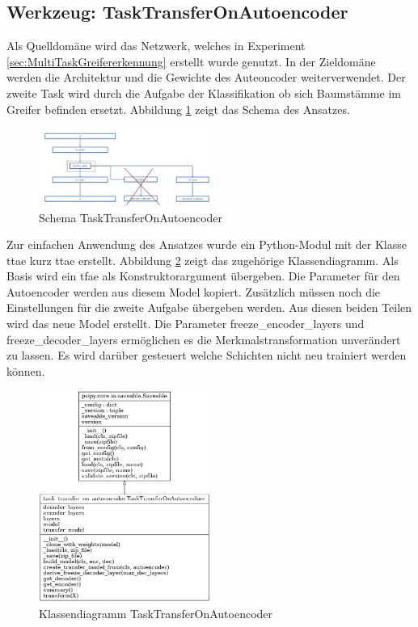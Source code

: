 	\subsection{Werkzeug: TaskTransferOnAutoencoder}
	\label{sec:TransferSecondCriterionAutoenocder}		
	Als Quelldomäne wird das Netzwerk, welches in Experiment \ref{sec:MultiTaskGreifererkennung} erstellt wurde genutzt. In der Zieldomäne werden die Architektur und die Gewichte des Auteoncoder weiterverwendet. Der zweite Task wird durch die Aufgabe der Klassifikation ob sich Baumstämme im Greifer befinden ersetzt. Abbildung \ref{img:SchemaTTAE} zeigt das Schema des Ansatzes. 
	\begin{figure}[h]
		\centering
		\includegraphics[width=0.5\textwidth, center]{bilder/Schema_Autoencoders/Schema_TSCAE.png}
		\caption[Schema TaskTransferOnAutoencoder]{Schema TaskTransferOnAutoencoder}
		\label{img:SchemaTTAE}
	\end{figure}
	Zur einfachen Anwendung des Ansatzes wurde ein Python-Modul mit der Klasse \acl{ttae} kurz \ac{ttae} erstellt. Abbildung \ref{img:KlassendiagrammTransferSecondCriterionAutoenocder} zeigt das zugehörige Klassendiagramm. Als Basis wird ein \ac{tfae} als Konstruktorargument übergeben. Die Parameter für den Autoencoder werden aus diesem Model kopiert. Zusätzlich müssen noch die Einstellungen für die zweite Aufgabe übergeben werden. Aus diesen beiden Teilen wird das neue Model erstellt. Die Parameter freeze\_encoder\_layers und freeze\_decoder\_layers ermöglichen es die Merkmalstransformation unverändert zu lassen. Es wird darüber gesteuert welche Schichten nicht neu trainiert werden können. 
	\begin{figure}[h]
		\centering
		\includegraphics[width=0.5\textwidth, center]{bilder/Klassendiagramme/TTAE.png}
		\caption[Klassendiagramm TaskTransferOnAutoencoder]{Klassendiagramm TaskTransferOnAutoencoder}
		\label{img:KlassendiagrammTransferSecondCriterionAutoenocder}
	\end{figure}  

